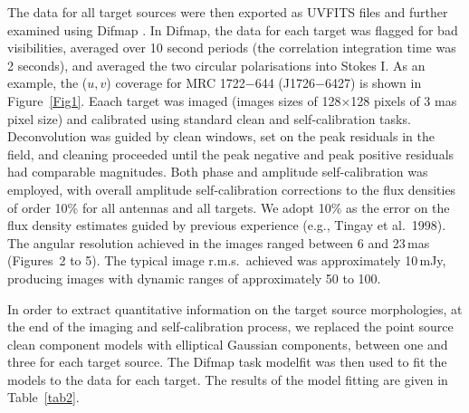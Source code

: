 \documentclass{pasa}%
\begin{document}
The data for all target sources were then exported as UVFITS files and
further examined using Difmap \cite{she97}.  In Difmap, the data for
each target was flagged for bad visibilities, averaged over 10 second
periods (the correlation integration time was 2 seconds), and averaged
the two circular polarisations into Stokes I.  As an example, the
($u,v$) coverage for
MRC 1722$-$644 (J1726$-$6427)
is shown in
Figure~\ref{Fig1}. Eaach target was imaged (images sizes of
128$\times$128 pixels of 3 mas pixel size) and calibrated using
standard clean and self-calibration tasks.  Deconvolution was guided
by clean windows, set on the peak residuals in the field, and cleaning
proceeded until the peak negative and peak positive residuals had
comparable magnitudes.  Both phase and amplitude self-calibration was
employed, with overall amplitude self-calibration corrections to the
flux densities of order 10\% for all antennas and all targets.
We
adopt 10\% as the error on the flux density estimates
guided by previous experience (e.g., Tingay et al.\ 1998).
The angular
resolution achieved in the images ranged between 6 and 23\,mas
(Figures~2 to 5).  The typical image r.m.s.\ achieved was approximately
10\,mJy, producing images with dynamic ranges of approximately 50 to
100.

In order to extract quantitative information on the target source
morphologies, at the end of the imaging and self-calibration process,
we replaced the point source clean component models 
with elliptical Gaussian components, between one and three for each
target source.
The Difmap task modelfit was then used to fit the
models to the data for each target.  The results of the model fitting
are given in Table~\ref{tab2}.
\end{document}

